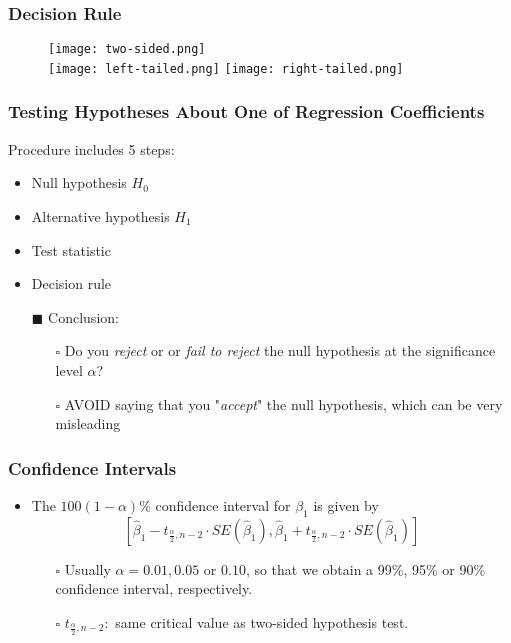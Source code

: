 \documentclass[11pt, xcolor=x11names,compress]{beamer}
\begin{document}
\begin{frame}[fragile,t]
\frametitle{Decision Rule}
\begin{figure}
    \centering
\texttt{[image: two-sided.png]}\\
\texttt{[image: left-tailed.png]}
\texttt{[image: right-tailed.png]}
    \caption{}
\end{figure}

\end{frame}

\begin{frame}[fragile,t]
\linespread{1.3}
\frametitle{Testing Hypotheses About One
of Regression Coefficients}

Procedure includes 5 steps:
\begin{itemize}
    \item Null hypothesis $H_0$
    \item Alternative hypothesis $H_1$
    \item Test statistic
    \item Decision rule
    \item [$\blacksquare$] Conclusion:
    \begin{itemize}
        \item [$\square$] Do you \textit{reject} or or \textit{fail to reject} the null hypothesis at the significance level $\alpha$?
        \item [$\square$] AVOID saying that you "\textit{accept}" the null hypothesis, which can be very misleading
    \end{itemize}
\end{itemize}
\end{frame}
\begin{frame}[fragile,t]
\frametitle{Confidence Intervals}\label{CIs}
\linespread{1.15}
\begin{itemize}
\item The $100(1-\alpha)\%$ confidence interval for $\beta_1$ is given by
$$
\left[\widehat{\beta}_{1} - t_{\frac{\alpha}{2}, n-2} \cdot S E\left(\widehat{\beta}_{1}\right), \widehat{\beta}_{1} + t_{\frac{\alpha}{2}, n-2} \cdot S E\left(\widehat{\beta}_{1}\right) \right]
$$
\begin{itemize}
    \item [$\square$] Usually $\alpha = 0.01, 0.05$ or $0.10$, so that we obtain a 99\%, 95\% or 90\% confidence interval, respectively.
    \vspace{2mm}
    \item [$\square$] $t_{\frac{\alpha}{2}, n-2}:$ same critical value as two-sided hypothesis test.
\end{itemize}
\end{itemize}
 \end{frame}
\end{document}
